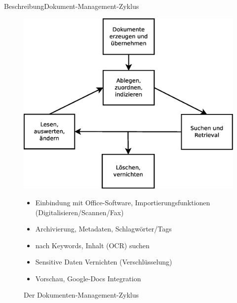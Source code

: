 \begin{frame}{Beschreibung}{Dokument-Management-Zyklus}
\begin{figure}
\centering
\includegraphics[width=.5\linewidth]{images/Dokumenten-Management-Zyklus}
\caption[Dokumenten-Managemente-Zyklus]{Der Dokumenten-Management-Zyklus \cite{Götzer2014}}
\label{dmk}
{
	\begin{itemize}
		\item Einbindung mit Office-Software, Importierungsfunktionen (Digitalisieren/Scannen/Fax)
		\item Archivierung, Metadaten, Schlagwörter/Tags
		\item nach Keywords, Inhalt (OCR) suchen
		\item Sensitive Daten Vernichten (Verschlüsselung)
		\item Vorschau, Google-Docs Integration
	\end{itemize}
}
\end{figure}
\end{frame}